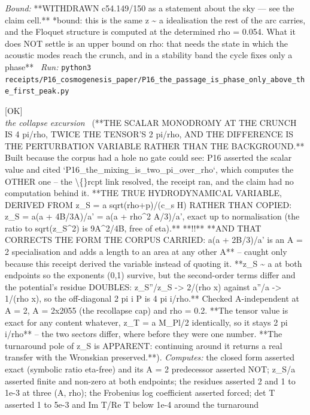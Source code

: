 \begin{description}
 \emph{Bound:} **WITHDRAWN c54.149/150 as a statement about the sky --- see the claim cell.** *bound: this is the same z \textasciitilde{} a idealisation the rest of the arc carries, and the Floquet structure is computed at the determined rho = 0.054. What it does NOT settle is an upper bound on rho: that needs the state in which the acoustic modes reach the crunch, and in a stability band the cycle fixes only a phase**
\ \emph{Run:} \texttt{python3 receipts/P16\_cosmogenesis\_paper/P16\_the\_passage\_is\_phase\_only\_above\_the\_first\_peak.py}
\item[\label{rcpt:P16_the_scalar_monodromy_is_four_pi_over_rho}\texttt{P16\_the\_scalar\_monodromy\_is\_four\_pi\_over\_rho}]\hfill\textsf{[OK]}\\
\textit{the collapse excursion} \ (**THE SCALAR MONODROMY AT THE CRUNCH IS 4 pi/rho, TWICE THE TENSOR'S 2 pi/rho, AND THE DIFFERENCE IS THE PERTURBATION VARIABLE RATHER THAN THE BACKGROUND.** Built because the corpus had a hole no gate could see: P16 asserted the scalar value and cited `P16\_the\_mixing\_is\_two\_pi\_over\_rho`, which computes the OTHER one -- the \textbackslash\{\}rcpt link resolved, the receipt ran, and the claim had no computation behind it. **THE TRUE HYDRODYNAMICAL VARIABLE, DERIVED FROM z\_S = a sqrt(rho+p)/(c\_s H) RATHER THAN COPIED: z\_S = a(a + 4B/3A)/a' = a(a + rho\textasciicircum{}2 A/3)/a', exact up to normalisation (the ratio to sqrt(z\_S\textasciicircum{}2) is 9A\textasciicircum{}2/4B, free of eta).** **!!** **AND THAT CORRECTS THE FORM THE CORPUS CARRIED: a(a + 2B/3)/a' is an A = 2 specialisation and adds a length to an area at any other A** -- caught only because this receipt derived the variable instead of quoting it. **z\_S \textasciitilde{} a at both endpoints so the exponents (0,1) survive, but the second-order terms differ and the potential's residue DOUBLES: z\_S''/z\_S -> 2/(rho x) against a''/a -> 1/(rho x), so the off-diagonal 2 pi i P is 4 pi i/rho.** Checked A-independent at A = 2, A = 2x2055 (the recollapse cap) and rho = 0.2. **The tensor value is exact for any content whatever, z\_T = a M\_Pl/2 identically, so it stays 2 pi i/rho** -- the two sectors differ, where before they were one number. **The turnaround pole of z\_S is APPARENT: continuing around it returns a real transfer with the Wronskian preserved.**). 
\emph{Computes:} the closed form asserted exact (symbolic ratio eta-free) and its A = 2 predecessor asserted NOT; z\_S/a asserted finite and non-zero at both endpoints; the residues asserted 2 and 1 to 1e-3 at three (A, rho); the Frobenius log coefficient asserted forced; det T asserted 1 to 5e-3 and \textbar{}Im T\textbar{}/\textbar{}Re T\textbar{} below 1e-4 around the turnaround

\end{description}
